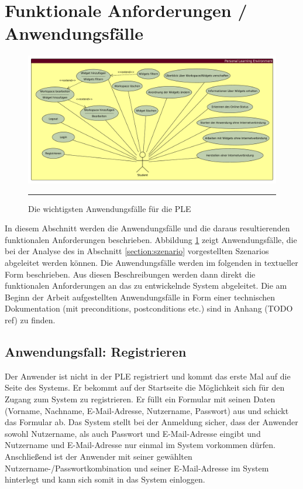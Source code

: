 \section{Funktionale Anforderungen / Anwendungsfälle}\label{section:anwendungsfaelle}
\begin{figure}[hb]
  \centering
  \includegraphics[width=\textwidth,height=\textheight,keepaspectratio]{./Figures/anwendungsfaelle_quer.pdf}
    \rule{35em}{0.5pt}
  \caption[Anwendungsfälle der PLE]{Die wichtigsten Anwendungsfälle für die PLE}
  \label{fig:anwendungsfaelle}
\end{figure}

In diesem Abschnitt werden die Anwendungsfälle und die daraus resultierenden funktionalen Anforderungen beschrieben. Abbildung \ref{fig:anwendungsfaelle} zeigt Anwendungsfälle, die bei der Analyse des in Abschnitt \ref{section:szenario} vorgestellten Szenarios abgeleitet werden können. Die Anwendungsfälle werden im folgenden in textueller Form beschrieben. Aus diesen Beschreibungen werden dann direkt die funktionalen Anforderungen an das zu entwickelnde System abgeleitet. Die am Beginn der Arbeit aufgestellten Anwendungsfälle in Form einer technischen Dokumentation (mit preconditions, postconditions etc.) sind in Anhang (TODO ref) zu finden.

\subsection{Anwendungsfall: Registrieren}
Der Anwender ist nicht in der PLE registriert und kommt das erste Mal auf die Seite des Systems. Er bekommt auf der Startseite die Möglichkeit sich für den Zugang zum System zu registrieren. Er füllt ein Formular mit seinen Daten (Vorname, Nachname, E-Mail-Adresse, Nutzername, Passwort) aus und schickt das Formular ab. Das System stellt bei der Anmeldung sicher, dass der Anwender sowohl Nutzername, als auch Passwort und E-Mail-Adresse eingibt und Nutzername und E-Mail-Adresse nur einmal im System vorkommen dürfen. Anschließend ist der Anwender mit seiner gewählten Nutzername-/Passwortkombination und seiner E-Mail-Adresse im System hinterlegt und kann sich somit in das System einloggen. 
 
